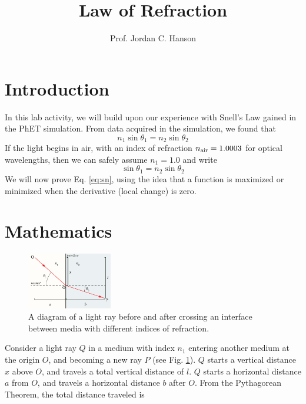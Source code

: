 \documentclass[12pt,twocolumn]{article}
\title{Law of Refraction}
\author{Prof. Jordan C. Hanson}
\begin{document}
\small
\maketitle

\section{Introduction}

\noindent
In this lab activity, we will build upon our experience with Snell's Law gained in the PhET simulation.  From data acquired in the simulation, we found that
\begin{equation}
n_1 \sin\theta_1 = n_2\sin\theta_2 \label{eq:sn}
\end{equation}
If the light begins in air, with an index of refraction $n_{\rm air} = 1.0003$ for optical wavelengths, then we can safely assume $n_1 = 1.0$ and write
\begin{equation}
\sin\theta_1 = n_2\sin\theta_2
\end{equation}
We will now prove Eq. \ref{eq:sn}, using the idea that a function is maximized or minimized when the derivative (local change) is zero.

\section{Mathematics}

\begin{figure}[hb]
\centering
\includegraphics[width=0.33\textwidth]{speeds.png}
\caption{\label{fig:ray} A diagram of a light ray before and after crossing an interface between media with different indices of refraction.}
\end{figure}

\noindent
Consider a light ray $Q$ in a medium with index $n_1$ entering another medium at the origin $O$, and becoming a new ray $P$ (see Fig. \ref{fig:ray}).  $Q$ starts a vertical distance $x$ above $O$, and travels a total vertical distance of $l$.  $Q$ starts a horizontal distance $a$ from $O$, and travels a horizontal distance $b$ after $O$.  From the Pythagorean Theorem, the total distance traveled is
\end{document}
